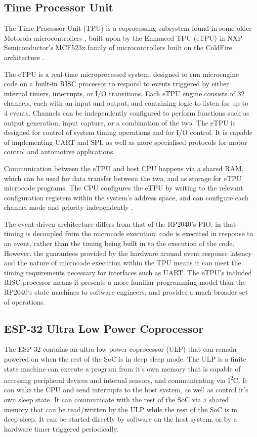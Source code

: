 \subsection{Time Processor Unit}

The Time Processor Unit (TPU) is a coprocessing subsystem found in some older Motorola microcontrollers \cite{tpu}, built upon by the Enhanced TPU (eTPU) in NXP Semiconductor's MCF523x family of microcontrollers built on the ColdFire architecture \cite{mfcdatasheet}.

The eTPU is a real-time microprocessed system, designed to run microengine code on a built-in RISC processor to respond to events triggered by either internal timers, interrupts, or I/O transitions. Each eTPU engine consists of 32 channels, each with an input and output, and containing logic to listen for up to 4 events. Channels can be independently configured to perform functions such as output generation, input capture, or a combination of the two. The eTPU is designed for control of system timing operations and for I/O control. It is capable of implementing UART and SPI, as well as more specialised protocols for motor control and automotive applications.

Communication between the eTPU and host CPU happens via a shared RAM, which can be used for data transfer between the two, and as storage for eTPU microcode programs. The CPU configures the eTPU by writing to the relevant configuration registers within the system's address space, and can configure each channel mode and priority independently \cite{etpu}.

The event-driven architecture differs from that of the RP2040's PIO, in that timing is decoupled from the microcode execution: code is executed in response to an event, rather than the timing being built in to the execution of the code. However, the guarantees provided by the hardware around event response latency and the nature of microcode execution within the TPU means it can meet the timing requirements necessary for interfaces such as UART. The eTPU's included RISC processor means it presents a more familiar programming model than the RP2040's state machines to software engineers, and provides a much broader set of operations.

\subsection{ESP-32 Ultra Low Power Coprocessor}

The ESP-32 contains an ultra-low power coprocessor (ULP) that can remain powered on when the rest of the SoC is in deep sleep mode. The ULP is a finite state machine can execute a program from it's own memory that is capable of accessing peripheral devices and internal sensors, and communicating via I\textsuperscript{2}C. It can wake the CPU and send interrupts to the host system, as well as control it's own sleep state. It can communicate with the rest of the SoC via a shared memory that can be read/written by the ULP while the rest of the SoC is in deep sleep. It can be started directly by software on the host system, or by a hardware timer triggered periodically.

